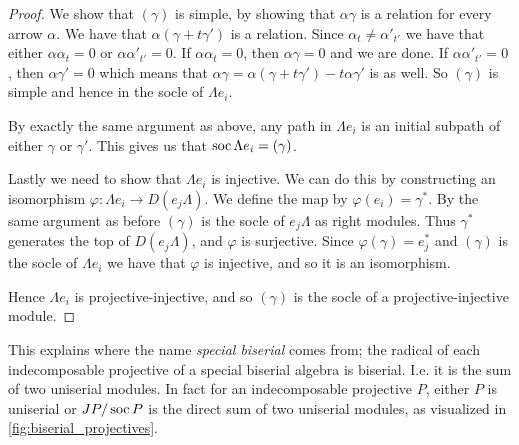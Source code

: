 \begin{prop}
\begin{proof}
		We show that $(\gamma)$ is simple, by showing that $\alpha\gamma$ is a relation for every arrow $\alpha$. We have that $\alpha(\gamma + t\gamma')$ is a relation. Since $\alpha_t \neq \alpha'_{t'}$ we have that either $\alpha\alpha_t = 0$ or $\alpha\alpha'_{t'} = 0$. If $\alpha\alpha_t=0$, then $\alpha\gamma=0$ and we are done. If $\alpha\alpha'_{t'} = 0$, then $\alpha\gamma'=0$ which means that $\alpha\gamma = \alpha(\gamma + t\gamma') - t\alpha\gamma'$ is as well. So $(\gamma)$ is simple and hence in the socle of $\Lambda e_i$.
		
		By exactly the same argument as above, any path in $\Lambda e_i$ is an initial subpath of either $\gamma$ or $\gamma'$. This gives us that $\operatorname{soc} \Lambda e_i = (\gamma)$.

		Lastly we need to show that $\Lambda e_i$ is injective. We can do this by constructing an isomorphism $\varphi \colon \Lambda e_i \to D(e_j \Lambda)$. We define the map by $\varphi(e_i) = \gamma^*$. By the same argument as before $(\gamma)$ is the socle of $e_j\Lambda$ as right modules. Thus $\gamma^*$ generates the top of $D(e_j \Lambda)$, and $\varphi$ is surjective. Since $\varphi(\gamma) = e_j^*$ and $(\gamma)$ is the socle of $\Lambda e_i$ we have that $\varphi$ is injective, and so it is an isomorphism.

		Hence $\Lambda e_i$ is projective-injective, and so $(\gamma)$ is the socle of a projective-injective module. 
	\end{proof} 
\end{prop}

This explains where the name \emph{special biserial} comes from; the radical of each indecomposable projective of a special biserial algebra is biserial. I.e. it is the sum of two uniserial modules. In fact for an indecomposable projective $P$, either $P$ is uniserial or $JP/\operatorname{soc} P$ is the direct sum of two uniserial modules, as visualized in \cref{fig:biserial_projectives}.

